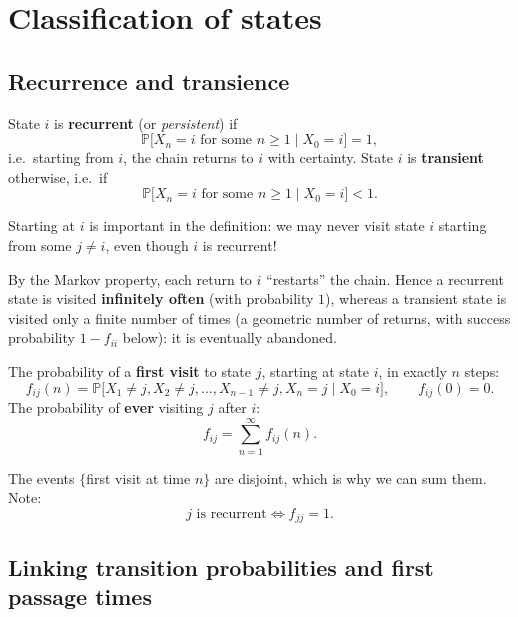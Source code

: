 \section{Classification of states}

\subsection{Recurrence and transience}

\begin{definition}
State $i$ is \textbf{recurrent} (or \emph{persistent}) if
\[
\mathbb{P}\big[X_n = i \text{ for some } n \geq 1 \mid X_0 = i\big] = 1,
\]
i.e.\ starting from $i$, the chain returns to $i$ with certainty. State $i$ is \textbf{transient} otherwise, i.e.\ if
\[
\mathbb{P}\big[X_n = i \text{ for some } n \geq 1 \mid X_0 = i\big] < 1.
\]
\end{definition}

\begin{remark}
Starting at $i$ is important in the definition: we may never visit state $i$ starting from some $j \neq i$, even though $i$ is recurrent!

By the Markov property, each return to $i$ ``restarts'' the chain. Hence a recurrent state is visited \textbf{infinitely often} (with probability $1$), whereas a transient state is visited only a finite number of times (a geometric number of returns, with success probability $1 - f_{ii}$ below): it is eventually abandoned.
\end{remark}

\begin{definition}
The probability of a \textbf{first visit} to state $j$, starting at state $i$, in exactly $n$ steps:
\[
f_{ij}(n) = \mathbb{P}\big[X_1 \neq j, X_2 \neq j, \dots, X_{n-1} \neq j, X_n = j \mid X_0 = i\big], \qquad f_{ij}(0) = 0.
\]
The probability of \textbf{ever} visiting $j$ after $i$:
\[
f_{ij} = \sum_{n=1}^\infty f_{ij}(n).
\]
\end{definition}

The events $\{$first visit at time $n\}$ are disjoint, which is why we can sum them. Note:
\[
j \text{ is recurrent} \iff f_{jj} = 1.
\]

\subsection{Linking transition probabilities and first passage times}

